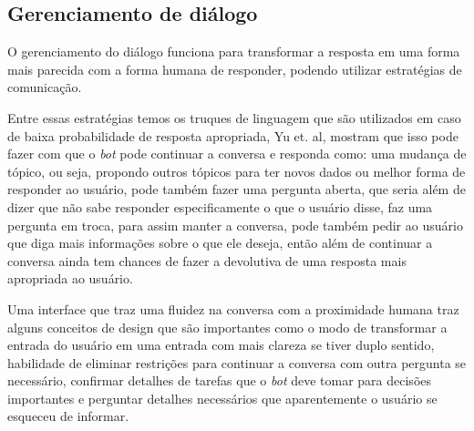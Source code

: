 \documentclass[
	12pt,				%
	oneside,
	a4paper,			%
	english,			%
	french,				%
	spanish,			%
	brazil				%
	]{abntex2}
\begin{document}
\subsection{Gerenciamento de diálogo}
O gerenciamento do diálogo funciona para transformar a resposta em uma forma mais parecida com a forma humana de responder, podendo utilizar estratégias de comunicação.

Entre essas estratégias temos os truques de linguagem que são utilizados em caso de baixa probabilidade de resposta apropriada, Yu et. al\supercite{dialogue-manag.}, mostram que isso pode fazer com que o \emph{bot} pode continuar a conversa e responda como: uma mudança de tópico, ou seja, propondo outros tópicos para ter novos dados ou melhor forma de responder ao usuário, pode também fazer uma pergunta aberta, que seria além de dizer que não sabe responder especificamente o que o usuário disse, faz uma pergunta em troca, para assim manter a conversa, pode também pedir ao usuário que diga mais informações sobre o que ele deseja, então além de continuar a conversa ainda tem chances de fazer a devolutiva de uma resposta mais apropriada ao usuário.

Uma interface que traz uma fluidez na conversa com a proximidade humana traz alguns conceitos de design que são importantes como o modo de transformar a entrada do usuário em uma entrada com mais clareza se tiver duplo sentido, habilidade de eliminar restrições para continuar a conversa com outra pergunta se necessário, confirmar detalhes  de tarefas que o \emph{bot} deve tomar para decisões importantes e perguntar detalhes necessários que aparentemente o usuário se esqueceu de informar.


\end{document}
